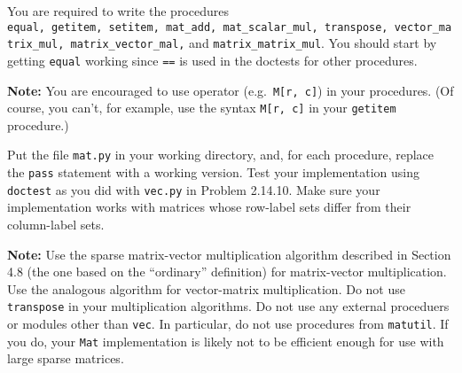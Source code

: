 \documentclass[
  letterpaper,
  DIV=11,
  numbers=noendperiod]{scrartcl}
\begin{document}
You are required to write the procedures
\texttt{equal,\ getitem,\ setitem,\ mat\_add,\ mat\_scalar\_mul,\ transpose,\ vector\_matrix\_mul,\ matrix\_vector\_mal,}
and \texttt{matrix\_matrix\_mul}. You should start by getting
\texttt{equal} working since \texttt{==} is used in the doctests for
other procedures.

\textbf{Note:} You are encouraged to use operator
(e.g.~\texttt{M{[}r,\ c{]}}) in your procedures. (Of course, you can't,
for example, use the syntax \texttt{M{[}r,\ c{]}} in your
\texttt{getitem} procedure.)

Put the file \texttt{mat.py} in your working directory, and, for each
procedure, replace the \texttt{pass} statement with a working version.
Test your implementation using \texttt{doctest} as you did with
\texttt{vec.py} in Problem 2.14.10. Make sure your implementation works
with matrices whose row-label sets differ from their column-label sets.

\textbf{Note:} Use the sparse matrix-vector multiplication algorithm
described in Section 4.8 (the one based on the ``ordinary'' definition)
for matrix-vector multiplication. Use the analogous algorithm for
vector-matrix multiplication. Do not use \texttt{transpose} in your
multiplication algorithms. Do not use any external proceduers or modules
other than \texttt{vec}. In particular, do not use procedures from
\texttt{matutil}. If you do, your \texttt{Mat} implementation is likely
not to be efficient enough for use with large sparse matrices.

\newpage{}
\end{document}
